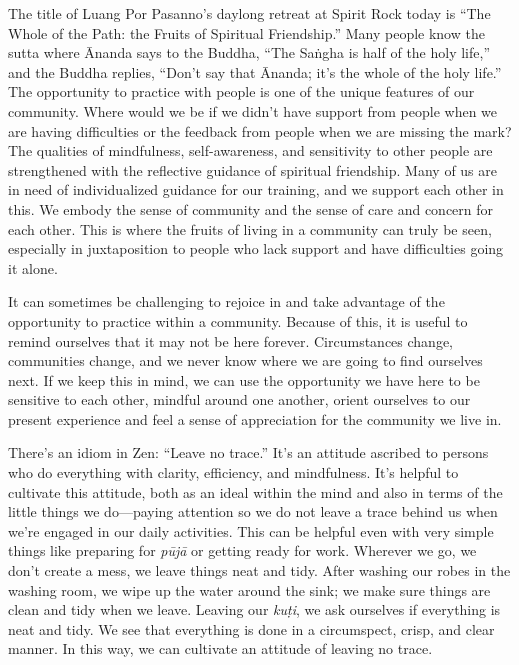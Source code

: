 The title of Luang Por Pasanno's daylong retreat at Spirit Rock today 
is ``The Whole of the Path: the Fruits of Spiritual Friendship.'' Many 
people know the sutta where Ānanda says to the Buddha, ``The Saṅgha 
is half of the holy life,'' and the Buddha replies, ``Don't say that 
Ānanda; it's the whole of the holy life.'' The opportunity to practice 
with people is one of the unique features of our community. Where would 
we be if we didn't have support from people when we are having 
difficulties or the feedback from people when we are missing the mark? 
The qualities of mindfulness, self-awareness, and sensitivity to other 
people are strengthened with the reflective guidance of spiritual 
friendship. Many of us are in need of individualized guidance for our 
training, and we support each other in this. We embody the sense of 
community and the sense of care and concern for each other. This is 
where the fruits of living in a community can truly be seen, especially 
in juxtaposition to people who lack support and have difficulties going 
it alone.

It can sometimes be challenging to rejoice in and take advantage of the 
opportunity to practice within a community. Because of this, it is 
useful to remind ourselves that it may not be here forever. 
Circumstances change, communities change, and we never know where we 
are going to find ourselves next. If we keep this in mind, we can use 
the opportunity we have here to be sensitive to each other, mindful 
around one another, orient ourselves to our present experience and feel 
a sense of appreciation for the community we live in.


There's an idiom in Zen: ``Leave no trace.'' It's an attitude ascribed 
to persons who do everything with clarity, efficiency, and mindfulness. 
It's helpful to cultivate this attitude, both as an ideal within the 
mind and also in terms of the little things we do---paying attention so 
we do not leave a trace behind us when we're engaged in our daily 
activities. This can be helpful even with very simple things like 
preparing for \emph{pūjā} or getting ready for work. Wherever we go, 
we don't create a mess, we leave things neat and tidy. After washing 
our robes in the washing room, we wipe up the water around the sink; we 
make sure things are clean and tidy when we leave. Leaving our 
\emph{kuṭi}, we ask ourselves if everything is neat and tidy. We see 
that everything is done in a circumspect, crisp, and clear manner. In 
this way, we can cultivate an attitude of leaving no trace.

